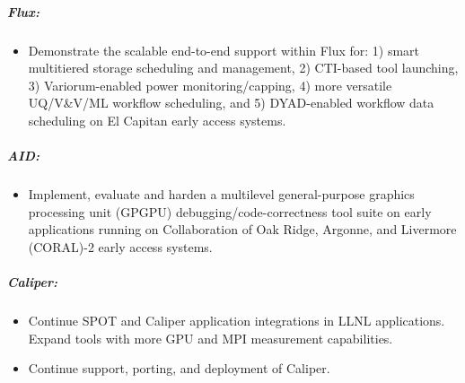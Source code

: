 \subparagraph{Flux:}

\begin{itemize}
\item Demonstrate the scalable end-to-end support within Flux for: 1) smart multitiered storage scheduling and management, 2) CTI-based tool launching, 3) Variorum-enabled power monitoring/capping, 4) more versatile UQ/V\&V/ML workflow scheduling, and 5) DYAD-enabled workflow data scheduling on El Capitan early access systems. 
\end{itemize}

\subparagraph{AID:}
\begin{itemize}
\item Implement, evaluate and harden a multilevel general-purpose graphics processing unit (GPGPU) debugging/code-correctness tool suite on early applications running on Collaboration of Oak Ridge, Argonne, and Livermore (CORAL)-2 early access systems. 
\end{itemize}

\subparagraph{Caliper:}
\begin{itemize}
\item Continue SPOT and Caliper application integrations in LLNL applications. Expand tools with more GPU and MPI measurement capabilities.
\item Continue support, porting, and deployment of Caliper.
\end{itemize}
